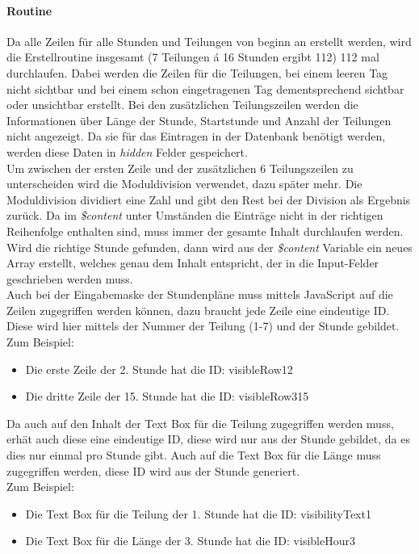 \paragraph{Routine\\}
Da alle Zeilen für alle Stunden und Teilungen von beginn an erstellt werden, wird die Erstellroutine insgesamt (7 Teilungen \'{a} 16 Stunden ergibt 112) 112 mal durchlaufen. Dabei werden die Zeilen für die Teilungen, bei einem leeren Tag nicht sichtbar und bei einem schon eingetragenen Tag dementsprechend sichtbar oder unsichtbar erstellt. Bei den zusätzlichen Teilungszeilen werden die Informationen über Länge der Stunde, Startstunde und Anzahl der Teilungen nicht angezeigt. Da sie für das Eintragen in der Datenbank benötigt werden, werden diese Daten in \textit{hidden} Felder gespeichert.\\
Um zwischen der ersten Zeile und der zusätzlichen 6 Teilungszeilen zu unterscheiden wird die Moduldivision verwendet, dazu später mehr. Die Moduldivision dividiert eine Zahl und gibt den Rest bei der Division als Ergebnis zurück. Da im \textit{\$content} unter Umständen die Einträge nicht in der richtigen Reihenfolge enthalten sind, muss immer der gesamte Inhalt durchlaufen werden. Wird die richtige Stunde gefunden, dann wird aus der \textit{\$content} Variable ein neues Array erstellt, welches genau dem Inhalt entspricht, der in die Input-Felder geschrieben werden muss.\\
Auch bei der Eingabemaske der Stundenpläne muss mittels JavaScript auf die Zeilen zugegriffen werden können, dazu braucht jede Zeile eine eindeutige ID. Diese wird hier mittels der Nummer der Teilung (1-7) und der Stunde gebildet.\\ 
Zum Beispiel:
\begin{itemize}
	\item Die erste Zeile der 2. Stunde hat die ID: visibleRow12
	\item Die dritte Zeile der 15. Stunde hat die ID: visibleRow315
\end{itemize}
Da auch auf den Inhalt der Text Box für die Teilung zugegriffen werden muss, erhät auch diese eine eindeutige ID, diese wird nur aus der Stunde gebildet, da es dies nur einmal pro Stunde gibt. Auch auf die Text Box für die Länge muss zugegriffen werden, diese ID wird aus der Stunde generiert.\\
Zum Beispiel:
\begin{itemize}
	\item Die Text Box für die Teilung der 1. Stunde hat die ID: visibilityText1
	\item Die Text Box für die Länge der 3. Stunde hat die ID: visibleHour3
\end{itemize}

